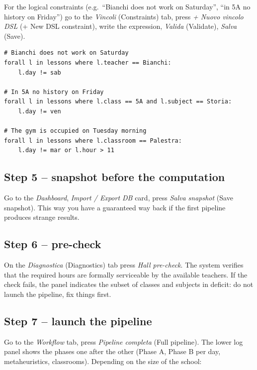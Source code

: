 For the logical constraints (e.g.\ ``Bianchi does not work on
Saturday'', ``in 5A no history on Friday'') go to the
\emph{Vincoli} (Constraints) tab, press \emph{+ Nuovo vincolo DSL}
(+ New DSL constraint), write the expression, \emph{Valida}
(Validate), \emph{Salva} (Save).

\begin{esempiobox}[title={Recurring constraints, in DSL}]
\begin{lstlisting}
# Bianchi does not work on Saturday
forall l in lessons where l.teacher == Bianchi:
    l.day != sab

# In 5A no history on Friday
forall l in lessons where l.class == 5A and l.subject == Storia:
    l.day != ven

# The gym is occupied on Tuesday morning
forall l in lessons where l.classroom == Palestra:
    l.day != mar or l.hour > 11
\end{lstlisting}
\end{esempiobox}

\subsection{Step 5 -- snapshot before the computation}

Go to the \emph{Dashboard}, \emph{Import / Export DB} card, press
\emph{Salva snapshot} (Save snapshot). This way you have a
guaranteed way back if the first pipeline produces strange
results.

\subsection{Step 6 -- pre-check}

On the \emph{Diagnostica} (Diagnostics) tab press
\emph{Hall pre-check}. The system verifies that the required hours
are formally serviceable by the available teachers. If the check
fails, the panel indicates the subset of classes and subjects in
deficit: do not launch the pipeline, fix things first.

\subsection{Step 7 -- launch the pipeline}

Go to the \emph{Workflow} tab, press \emph{Pipeline completa}
(Full pipeline). The lower log panel shows the phases one after
the other (Phase A, Phase B per day, metaheuristics, classrooms).
Depending on the size of the school:

